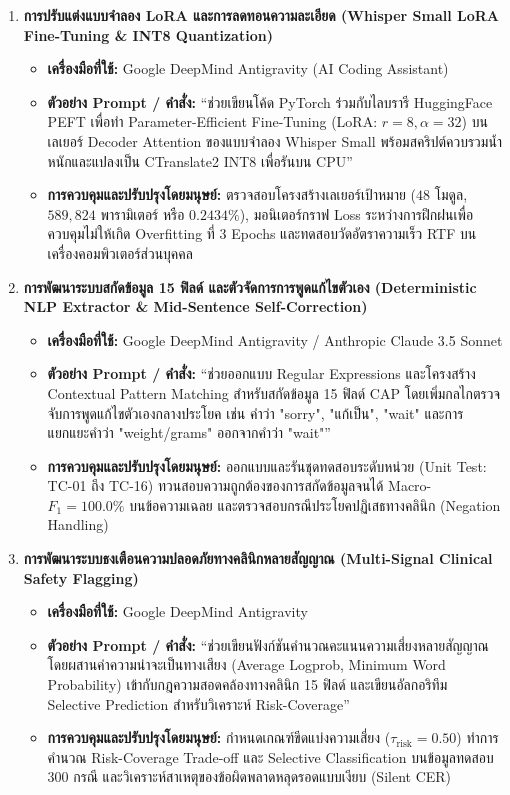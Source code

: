\begin{enumerate}[label=\textbf{\arabic*.}, leftmargin=*, align=left]
\item \textbf{การปรับแต่งแบบจำลอง LoRA และการลดทอนความละเอียด (Whisper Small LoRA Fine-Tuning \& INT8 Quantization)}
\begin{itemize}[leftmargin=1.5em]
    \item \textbf{เครื่องมือที่ใช้:} Google DeepMind Antigravity (AI Coding Assistant)
    \item \textbf{ตัวอย่าง Prompt / คำสั่ง:} ``ช่วยเขียนโค้ด PyTorch ร่วมกับไลบรารี HuggingFace PEFT เพื่อทำ Parameter-Efficient Fine-Tuning (LoRA: $r=8, \alpha=32$) บนเลเยอร์ Decoder Attention ของแบบจำลอง Whisper Small พร้อมสคริปต์ควบรวมน้ำหนักและแปลงเป็น CTranslate2 INT8 เพื่อรันบน CPU''
    \item \textbf{การควบคุมและปรับปรุงโดยมนุษย์:} ตรวจสอบโครงสร้างเลเยอร์เป้าหมาย ($48$ โมดูล, $589,824$ พารามิเตอร์ หรือ $0.2434\%$), มอนิเตอร์กราฟ Loss ระหว่างการฝึกฝนเพื่อควบคุมไม่ให้เกิด Overfitting ที่ 3 Epochs และทดสอบวัดอัตราความเร็ว RTF บนเครื่องคอมพิวเตอร์ส่วนบุคคล
\end{itemize}

\item \textbf{การพัฒนาระบบสกัดข้อมูล 15 ฟิลด์ และตัวจัดการการพูดแก้ไขตัวเอง (Deterministic NLP Extractor \& Mid-Sentence Self-Correction)}
\begin{itemize}[leftmargin=1.5em]
    \item \textbf{เครื่องมือที่ใช้:} Google DeepMind Antigravity / Anthropic Claude 3.5 Sonnet
    \item \textbf{ตัวอย่าง Prompt / คำสั่ง:} ``ช่วยออกแบบ Regular Expressions และโครงสร้าง Contextual Pattern Matching สำหรับสกัดข้อมูล 15 ฟิลด์ CAP โดยเพิ่มกลไกตรวจจับการพูดแก้ไขตัวเองกลางประโยค เช่น คำว่า "sorry", "แก้เป็น", "wait" และการแยกแยะคำว่า "weight/grams" ออกจากคำว่า "wait"''
    \item \textbf{การควบคุมและปรับปรุงโดยมนุษย์:} ออกแบบและรันชุดทดสอบระดับหน่วย (Unit Test: TC-01 ถึง TC-16) ทวนสอบความถูกต้องของการสกัดข้อมูลจนได้ Macro-$F_1 = 100.0\%$ บนข้อความเฉลย และตรวจสอบกรณีประโยคปฏิเสธทางคลินิก (Negation Handling)
\end{itemize}

\item \textbf{การพัฒนาระบบธงเตือนความปลอดภัยทางคลินิกหลายสัญญาณ (Multi-Signal Clinical Safety Flagging)}
\begin{itemize}[leftmargin=1.5em]
    \item \textbf{เครื่องมือที่ใช้:} Google DeepMind Antigravity
    \item \textbf{ตัวอย่าง Prompt / คำสั่ง:} ``ช่วยเขียนฟังก์ชันคำนวณคะแนนความเสี่ยงหลายสัญญาณ โดยผสานค่าความน่าจะเป็นทางเสียง (Average Logprob, Minimum Word Probability) เข้ากับกฎความสอดคล้องทางคลินิก 15 ฟิลด์ และเขียนอัลกอริทึม Selective Prediction สำหรับวิเคราะห์ Risk-Coverage''
    \item \textbf{การควบคุมและปรับปรุงโดยมนุษย์:} กำหนดเกณฑ์ขีดแบ่งความเสี่ยง ($\tau_{\text{risk}} = 0.50$) ทำการคำนวณ Risk-Coverage Trade-off และ Selective Classification บนข้อมูลทดสอบ 300 กรณี และวิเคราะห์สาเหตุของข้อผิดพลาดหลุดรอดแบบเงียบ (Silent CER)
\end{itemize}


\end{enumerate}
